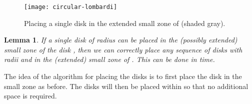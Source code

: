 \documentclass[11pt]{article}
\newtheorem{lemma}{Lemma}
\newenvironment{proof}{\noindent{\bf Proof:}}{\bigskip} \makeatletter
\begin{document}
\begin{figure}[bt]
  \centering
  \texttt{[image: circular-lombardi]}
  \caption{Placing a single disk  in the extended small zone of
     (shaded gray).}
  \label{fig:small-zone}
\end{figure}

\begin{lemma}\label{lem:one-size-fits-all}
  If a single disk  of radius  can be placed in the (possibly
  extended) small zone of the disk , then we can correctly place
  any sequence of  disks  with radii  and  in the (extended)
  small zone of . This can be done in  time.
\end{lemma}


\begin{proof}
  The idea of the algorithm for placing the  disks is to first
  place the disk  in the small zone as before. The disks  will then be placed within  so that no additional
  space is required.


\end{proof}
\end{document}
